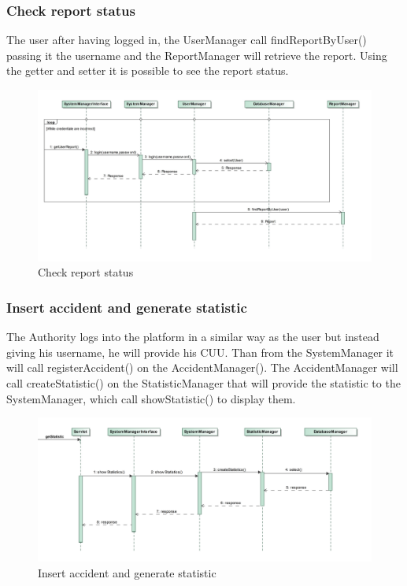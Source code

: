 \subsubsection{Check report status}
The user after having logged in, the UserManager call findReportByUser() passing it the username and the ReportManager will retrieve the report. Using the getter and setter it is possible to see the report status.
\begin{figure}[H]
	\centering
	\includegraphics[width=0.95\linewidth, height=0.4\textheight]{Images/RunTimeDiagram/Sequence3}
	\caption{Check report status}
	\label{fig:Check report status}
\end{figure}
\subsubsection{Insert accident and generate statistic}
The Authority logs into the platform in a similar way as the user but instead giving his username, he will provide his CUU. Than from the SystemManager it will call registerAccident() on the AccidentManager(). The AccidentManager will call createStatistic() on the StatisticManager that will provide the statistic to the SystemManager, which call showStatistic() to display them.
\begin{figure}[H]
	\centering
	\includegraphics[width=0.95\linewidth, height=0.45\textheight]{Images/RunTimeDiagram/Sequence4}
	\caption{Insert accident and generate statistic}
	\label{fig:Insert accident and generate statistic}
\end{figure}
